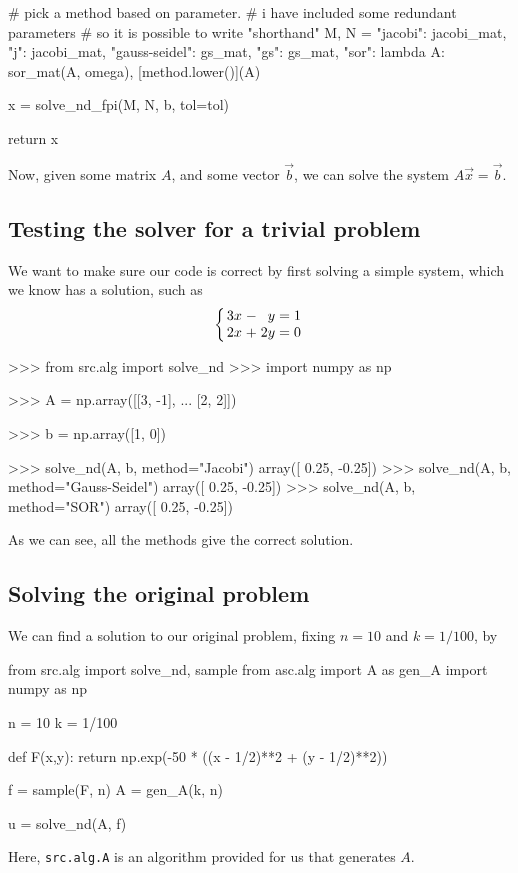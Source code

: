 \documentclass[12pt]{article}
\begin{document}
\begin{multicols}{2}
\begin{python}[
        caption={Argument-``parser'' and choice of $M$, $N$.}
    ]
    # pick a method based on parameter.
    # i have included some redundant parameters
    # so it is possible to write "shorthand"
    M, N = {
        "jacobi":        jacobi_mat,
        "j":             jacobi_mat,
        "gauss-seidel":  gs_mat,
        "gs":            gs_mat,
        "sor": lambda A: sor_mat(A, omega),
    }[method.lower()](A)

    x = solve_nd_fpi(M, N, b, tol=tol)

    return x
    \end{python}
    Now, given some matrix $A$, and some vector $\vec b$,
    we can solve the system $A\vec x = \vec b$.

    \subsection*{Testing the solver for a trivial problem}
    We want to make sure our code is correct by first
    solving a simple system, which we know has a solution,
    such as
    \[
        \arraycolsep=1.4pt\def\arraystretch{1}
        \left\{\begin{array}{rcrcr}
            3x &-&  y &=&  1 \\
            2x &+& 2y &=&  0 \\
        \end{array}\right.
    \]
    \begin{python}
>>> from src.alg import solve_nd
>>> import numpy as np

>>> A = np.array([[3, -1],
...               [2,  2]])

>>> b = np.array([1, 0])

>>> solve_nd(A, b, method="Jacobi")
array([ 0.25, -0.25])
>>> solve_nd(A, b, method="Gauss-Seidel")
array([ 0.25, -0.25])
>>> solve_nd(A, b, method="SOR")
array([ 0.25, -0.25])
    \end{python}
    As we can see, all the methods give the correct solution.

    \subsection*{Solving the original problem}

    We can find a solution to our original problem,
    fixing $n = 10$ and $k = 1/100$, by
    \begin{python}
from src.alg import solve_nd, sample
from asc.alg import A as gen_A
import numpy as np

n = 10
k = 1/100

def F(x,y):
    return np.exp(-50 * ((x - 1/2)**2 + (y - 1/2)**2))

f = sample(F, n)
A = gen_A(k, n)

u = solve_nd(A, f)
    \end{python}
    Here, {\tt src.alg.A} is an algorithm provided for us that generates $A$.
\end{multicols}
\end{document}

